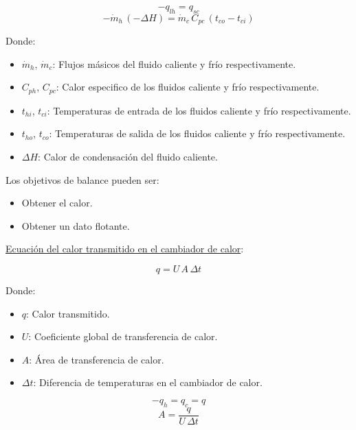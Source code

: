 \begin{equation*}
    -q_{lh} = q_{sc}
\end{equation*}
\begin{equation}
    -\dot{m}_h\,(-\Delta H) = \dot{m}_c\,C_{pc}\,(t_{co} - t_{ci})
\end{equation}

Donde:
\begin{itemize}
    \item $\dot{m}_h$, $\dot{m}_c$: Flujos másicos del fluido caliente y frío
        respectivamente.
    \item $C_{ph}$, $C_{pc}$: Calor especifico de los fluidos caliente y frío
        respectivamente.
    \item $t_{hi}$, $t_{ci}$: Temperaturas de entrada de los fluidos caliente y 
        frío respectivamente.
    \item $t_{ho}$, $t_{co}$: Temperaturas de salida de los fluidos caliente y 
        frío respectivamente.
    \item $\Delta H$: Calor de condensación del fluido caliente.
\end{itemize}


Los objetivos de balance pueden ser:
\begin{itemize}
    \item Obtener el calor.
    \item Obtener un dato flotante.
\end{itemize}

\underline{Ecuación del calor transmitido en el cambiador de calor}:

\begin{equation}
    q = U\,A\,\Delta t
\end{equation}

Donde:
\begin{itemize}
    \item $q$: Calor transmitido.
    \item $U$: Coeficiente global de transferencia de calor.
    \item $A$: Área de transferencia de calor.
    \item $\Delta t$: Diferencia de temperaturas en el cambiador de calor.
\end{itemize}

\begin{equation*}
    -q_h = q_c = q
\end{equation*}
\begin{equation}
    A = \frac{q}{U\,\Delta t}
\end{equation}

